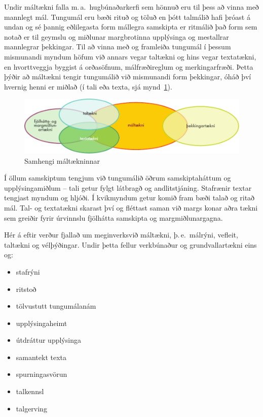\documentclass{../../metanetpaper}
\begin{document}
\begin{multicols}{2}

Undir máltækni falla m.\,a.~hugbúnaðarkerfi sem hönnuð eru til þess að vinna með mannlegt mál. Tungumál eru bæði rituð og töluð en þótt talmálið hafi þróast á undan og sé þannig eðlilegasta form mállegra samskipta er ritmálið það form sem notað er til geymslu og miðlunar margbrotinna upplýsinga og mestallrar mannlegrar þekkingar. Til að vinna með og framleiða tungumál í þessum mismunandi myndum höfum við annars vegar taltækni og hins vegar textatækni, en hvorttveggja byggist á orðasöfnum, málfræðireglum og merkingarfræði. Þetta þýðir að máltækni tengir tungumálið við mismunandi form þekkingar, óháð því hvernig henni er miðlað (í tali eða texta, sjá mynd~\ref{fig:ltincontext_is}).

\begin{figure}[htb]
  \center
  \includegraphics[width=\textwidth]{../_media/icelandic/language_technologies}
  \caption{Samhengi máltækninnar}
  \label{fig:ltincontext_is}
\end{figure}

Í öllum samskiptum tengjum við tungumálið öðrum samskiptaháttum og upplýsingamiðlum -- tali getur fylgt látbragð og andlitstjáning. Stafrænir textar tengjast myndum og hljóði. Í kvikmyndum getur komið fram bæði talað og ritað mál. Tal- og textatækni skarast því og fléttast saman við margs konar aðra tækni sem greiðir fyrir úrvinnslu fjölhátta samskipta og margmiðlunargagna.

Hér á eftir verður fjallað um meginverksvið máltækni, þ.\,e.~málrýni, vefleit, taltækni og vélþýðingar. Undir þetta fellur verkbúnaður og grundvallartækni eins og:

\begin{itemize}
\item stafrýni
\item ritstoð
\item tölvustutt tungumálanám
\item upplýsingaheimt 
\item útdráttur upplýsinga
\item samantekt texta
\item spurningasvörun
\item talkennsl
\item talgerving
\end{itemize}


\end{multicols}
\end{document}
